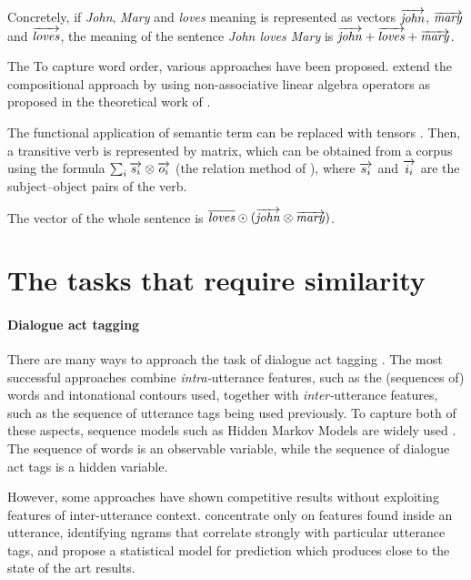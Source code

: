 Concretely, if \textit{John}, \textit{Mary} and \textit{loves} meaning is
represented as vectors $\overrightarrow{\mathit{john}}$, $\overrightarrow{\mathit{mary}}$ and
$\overrightarrow{\mathit{loves}}$, the meaning of the sentence \textit{John loves Mary} is
$\overrightarrow{\mathit{john}} + \overrightarrow{\mathit{loves}} + \overrightarrow{\mathit{mary}}$.

The To capture word order, various approaches have been
proposed.  extend the
compositional approach by using non-associative linear algebra
operators as proposed in the theoretical work of
\cite{coecke2010}.

The functional application of semantic term can be replaced with tensors
\cite{bourbaki}. Then, a transitive verb is represented by matrix, which can be
obtained from a corpus using the formula $\sum_i\overrightarrow{s_i} \otimes \overrightarrow{o_i}$ (the
relation method of \cite{grefenstette2011experimental}), where $\overrightarrow{s_i}$ and
$\overrightarrow{i_i}$ are the subject--object pairs of the verb.

The vector of the whole sentence is $\overline{\mathit{loves}}
\odot(\overrightarrow{\mathit{john}} \otimes \overrightarrow{\mathit{mary}})$.

\section{The tasks that require similarity}
\label{sec:nlp-tasks}

\paragraph{Dialogue act tagging}
\label{sec:dialogue-act-tagging}

There are many ways to approach the task of dialogue act tagging
\cite{Stolcke.etal00}. The most successful approaches combine
\emph{intra-}utterance features, such as the (sequences of) words and
intonational contours used, together with \emph{inter-}utterance
features, such as the sequence of utterance tags being used
previously.
%
To capture both of these aspects, sequence models such as Hidden
Markov Models are widely used
\cite{Stolcke.etal00,surendran2006dialog}. The sequence of words is an
observable variable, while the sequence of dialogue act tags is a
hidden variable.

However, some approaches have shown competitive results without
exploiting features of inter-utterance
context.  concentrate only on features found
inside an utterance, identifying ngrams that correlate strongly with
particular utterance tags, and propose a statistical model for
prediction which produces close to the state of the art results.

